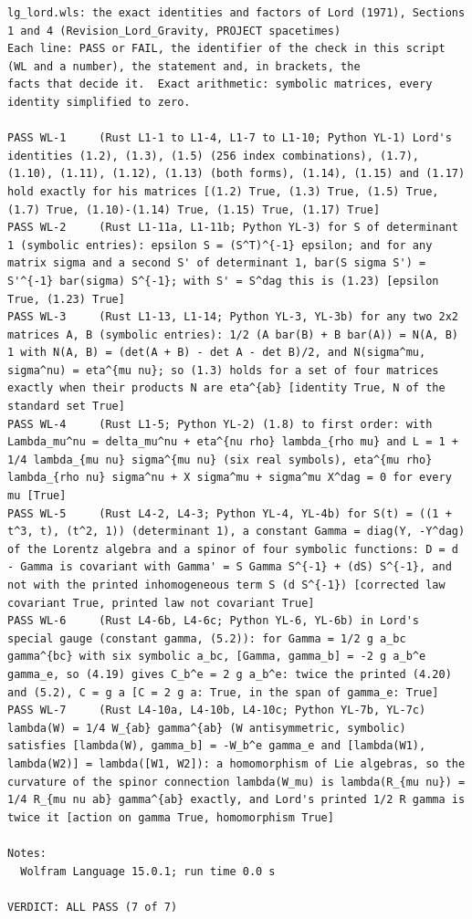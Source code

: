 \documentclass[
  10pt,
]{article}
\begin{document}
\begin{verbatim}
lg_lord.wls: the exact identities and factors of Lord (1971), Sections 1 and 4 (Revision_Lord_Gravity, PROJECT spacetimes)
Each line: PASS or FAIL, the identifier of the check in this script (WL and a number), the statement and, in brackets, the
facts that decide it.  Exact arithmetic: symbolic matrices, every identity simplified to zero.

PASS WL-1     (Rust L1-1 to L1-4, L1-7 to L1-10; Python YL-1) Lord's identities (1.2), (1.3), (1.5) (256 index combinations), (1.7), (1.10), (1.11), (1.12), (1.13) (both forms), (1.14), (1.15) and (1.17) hold exactly for his matrices [(1.2) True, (1.3) True, (1.5) True, (1.7) True, (1.10)-(1.14) True, (1.15) True, (1.17) True]
PASS WL-2     (Rust L1-11a, L1-11b; Python YL-3) for S of determinant 1 (symbolic entries): epsilon S = (S^T)^{-1} epsilon; and for any matrix sigma and a second S' of determinant 1, bar(S sigma S') = S'^{-1} bar(sigma) S^{-1}; with S' = S^dag this is (1.23) [epsilon True, (1.23) True]
PASS WL-3     (Rust L1-13, L1-14; Python YL-3, YL-3b) for any two 2x2 matrices A, B (symbolic entries): 1/2 (A bar(B) + B bar(A)) = N(A, B) 1 with N(A, B) = (det(A + B) - det A - det B)/2, and N(sigma^mu, sigma^nu) = eta^{mu nu}; so (1.3) holds for a set of four matrices exactly when their products N are eta^{ab} [identity True, N of the standard set True]
PASS WL-4     (Rust L1-5; Python YL-2) (1.8) to first order: with Lambda_mu^nu = delta_mu^nu + eta^{nu rho} lambda_{rho mu} and L = 1 + 1/4 lambda_{mu nu} sigma^{mu nu} (six real symbols), eta^{mu rho} lambda_{rho nu} sigma^nu + X sigma^mu + sigma^mu X^dag = 0 for every mu [True]
PASS WL-5     (Rust L4-2, L4-3; Python YL-4, YL-4b) for S(t) = ((1 + t^3, t), (t^2, 1)) (determinant 1), a constant Gamma = diag(Y, -Y^dag) of the Lorentz algebra and a spinor of four symbolic functions: D = d - Gamma is covariant with Gamma' = S Gamma S^{-1} + (dS) S^{-1}, and not with the printed inhomogeneous term S (d S^{-1}) [corrected law covariant True, printed law not covariant True]
PASS WL-6     (Rust L4-6b, L4-6c; Python YL-6, YL-6b) in Lord's special gauge (constant gamma, (5.2)): for Gamma = 1/2 g a_bc gamma^{bc} with six symbolic a_bc, [Gamma, gamma_b] = -2 g a_b^e gamma_e, so (4.19) gives C_b^e = 2 g a_b^e: twice the printed (4.20) and (5.2), C = g a [C = 2 g a: True, in the span of gamma_e: True]
PASS WL-7     (Rust L4-10a, L4-10b, L4-10c; Python YL-7b, YL-7c) lambda(W) = 1/4 W_{ab} gamma^{ab} (W antisymmetric, symbolic) satisfies [lambda(W), gamma_b] = -W_b^e gamma_e and [lambda(W1), lambda(W2)] = lambda([W1, W2]): a homomorphism of Lie algebras, so the curvature of the spinor connection lambda(W_mu) is lambda(R_{mu nu}) = 1/4 R_{mu nu ab} gamma^{ab} exactly, and Lord's printed 1/2 R gamma is twice it [action on gamma True, homomorphism True]

Notes:
  Wolfram Language 15.0.1; run time 0.0 s

VERDICT: ALL PASS (7 of 7)
\end{verbatim}
\end{document}
